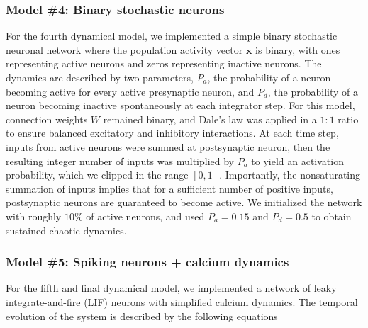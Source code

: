 \documentclass{article}
\begin{document}
\subsubsection*{Model \#4: Binary stochastic neurons}

For the fourth dynamical model, we implemented a simple binary stochastic neuronal network where the population activity vector $\textbf{x}$ is binary, with ones representing active neurons and zeros representing inactive neurons. The dynamics are described by two parameters, $P_a$, the probability of a neuron becoming active for every active presynaptic neuron, and $P_d$, the probability of a neuron becoming inactive spontaneously at each integrator step. For this model, connection weights $W$ remained binary, and Dale's law was applied in a $1:1$ ratio to ensure balanced excitatory and inhibitory interactions. At each time step, inputs from active neurons were summed at postsynaptic neuron, then the resulting integer number of inputs was multiplied by $P_a$ to yield an activation probability, which we clipped in the range $[0, 1]$. Importantly, the nonsaturating summation of inputs implies that for a sufficient number of positive inputs, postsynaptic neurons are guaranteed to become active. We initialized the network with roughly $10\%$ of active neurons, and used $P_a=0.15$ and $P_d=0.5$ to obtain sustained chaotic dynamics.

\subsubsection*{Model \#5: Spiking neurons + calcium dynamics}

For the fifth and final dynamical model, we implemented a network of leaky integrate-and-fire (LIF) neurons\cite{izhikevich2007dynamical} with simplified calcium dynamics. The temporal evolution of the system is described by the following equations
\end{document}
